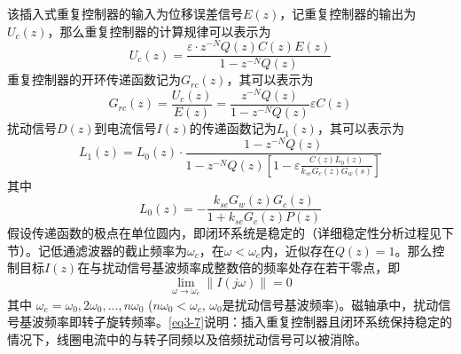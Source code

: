 该插入式重复控制器的输入为位移误差信号$E(z)$，记重复控制器的输出为$U_c(z)$，那么重复控制器的计算规律可以表示为
\begin{equation}
{U_c}\left( z \right) = \frac{{\varepsilon  \cdot {z^{ - N}}Q\left( z \right)C\left( z \right)E\left( z \right)}}{{1 - {z^{ - N}}Q\left( z \right)}}
\label{eq3-3}
\end{equation}
重复控制器的开环传递函数记为$G_{rc}(z)$，其可以表示为
\begin{equation}
{G_{rc}}\left( z \right) = \frac{{{U_c}\left( z \right)}}{{E\left( z \right)}} = \frac{{{z^{ - N}}Q\left( z \right)}}{{1 - {z^{ - N}}Q\left( z \right)}}\varepsilon C\left( z \right)
\label{eq3-4}
\end{equation}
扰动信号$D(z)$到电流信号$I(z)$的传递函数记为$L_1(z)$，其可以表示为
\begin{equation}
{L_1}\left( z \right) = {L_0}\left( z \right) \cdot \frac{{1 - {z^{ - N}}Q\left( z \right)}}{{1 - {z^{ - N}}Q\left( z \right)\left[ {1 - \varepsilon \frac{{C\left( z \right){L_0}\left( z \right)}}{{{k_{se}}{G_c}\left( z \right){G_w}\left( s \right)}}} \right]}}
\label{eq3-5}
\end{equation}
其中
\begin{equation}
{L_0}\left( z \right) =  - \frac{{{k_{se}}{G_w}\left( z \right){G_c}\left( z \right)}}{{1 + {k_{se}}{G_c}\left( z \right)P\left( z \right)}}
\label{eq3-6}
\end{equation}
假设传递函数的极点在单位圆内，即闭环系统是稳定的（详细稳定性分析过程见下节）。记低通滤波器的截止频率为$\omega_c $，在$\omega<\omega_c$内，近似存在$Q(z)=1$。那么控制目标$I(z)$在与扰动信号基波频率成整数倍的频率处存在若干零点，即
\begin{equation}
\label{eq3-7}
\mathop {\lim }\limits_{\omega  \to {\omega _e}} \left\| {I\left( {j\omega } \right)} \right\| = 0
\end{equation}
其中 $\omega _e=\omega _0, 2\omega _0,...,n\omega _0$ ($n\omega _0$$<$$\omega _c$, $\omega _0$是扰动信号基波频率)。磁轴承中，扰动信号基波频率即转子旋转频率。\autoref{eq3-7}说明：插入重复控制器且闭环系统保持稳定的情况下，线圈电流中的与转子同频以及倍频扰动信号可以被消除。

